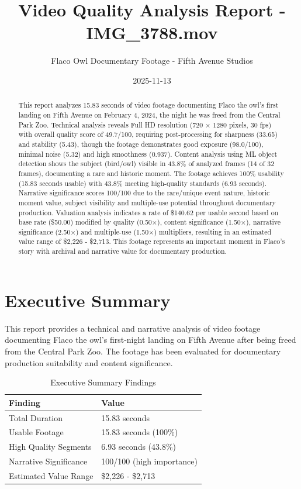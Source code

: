 \documentclass[
  11pt,
]{article}
\title{Video Quality Analysis Report - IMG\_3788.mov}
\subtitle{Flaco Owl Documentary Footage - Fifth Avenue Studios}
\author{}
\date{2025-11-13}
\begin{document}
\maketitle
\begin{abstract}
This report analyzes 15.83 seconds of video footage documenting Flaco
the owl's first landing on Fifth Avenue on February 4, 2024, the night
he was freed from the Central Park Zoo. Technical analysis reveals Full
HD resolution (720 × 1280 pixels, 30 fps) with overall quality score of
49.7/100, requiring post-processing for sharpness (33.65) and stability
(5.43), though the footage demonstrates good exposure (98.0/100),
minimal noise (5.32) and high smoothness (0.937). Content analysis using
ML object detection shows the subject (bird/owl) visible in 43.8\% of
analyzed frames (14 of 32 frames), documenting a rare and historic
moment. The footage achieves 100\% usability (15.83 seconds usable) with
43.8\% meeting high-quality standards (6.93 seconds). Narrative
significance scores 100/100 due to the rare/unique event nature,
historic moment value, subject visibility and multiple-use potential
throughout documentary production. Valuation analysis indicates a rate
of \$140.62 per usable second based on base rate (\$50.00) modified by
quality (0.50×), content significance (1.50×), narrative significance
(2.50×) and multiple-use (1.50×) multipliers, resulting in an estimated
value range of \$2,226 - \$2,713. This footage represents an important
moment in Flaco's story with archival and narrative value for
documentary production.
\end{abstract}
\ifdefined\Shaded\renewenvironment{Shaded}{\begin{tcolorbox}[interior hidden, borderline west={3pt}{0pt}{shadecolor}, enhanced, boxrule=0pt, frame hidden, breakable, sharp corners]}{\end{tcolorbox}}\fi

\needspace{8cm}
\section{Executive Summary}

This report provides a technical and narrative analysis of video footage
documenting Flaco the owl's first-night landing on Fifth Avenue after
being freed from the Central Park Zoo. The footage has been evaluated
for documentary production suitability and content significance.

\begin{table}[h]
\centering
\small
\caption{Executive Summary Findings}
\label{tab-exec-summary}
\begin{tabular}{p{3cm}p{8cm}}
\toprule
\textbf{Finding} & \textbf{Value} \\
\midrule
Total Duration & 15.83 seconds \\
Usable Footage & 15.83 seconds (100\%) \\
High Quality Segments & 6.93 seconds (43.8\%) \\
Narrative Significance & 100/100 (high importance) \\
Estimated Value Range & \$2,226 - \$2,713 \\
\bottomrule
\end{tabular}
\end{table}
\end{document}

